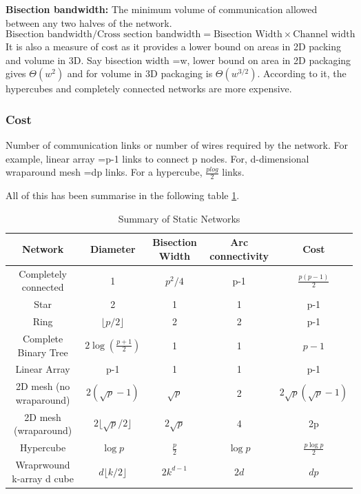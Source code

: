 \documentclass[12pt]{book}
\begin{document}
\textbf{Bisection bandwidth: }The minimum volume of communication allowed between any two halves of the network.
\begin{equation}
    \text{Bisection bandwidth/Cross section bandwidth} = \text{Bisection Width} \times \text{Channel width}
\end{equation}
It is also a measure of cost as it provides a lower bound on areas in 2D packing and volume in 3D.
Say bisection width =w, lower bound on area in 2D packaging gives $\Theta(w^2)$ and for volume in 3D packaging is $\Theta(w^{3/2})$.
According to it, the hypercubes and completely connected networks are more expensive.

\subsubsection{Cost}
Number of communication links or number of wires required by the network.
For example, linear array =p-1 links to connect p nodes. For, d-dimensional wraparound mesh =dp links.
For a hypercube, $\frac{plog}{2}$ links. 

All of this has been summarise in the following table \ref{tab:static_network}. 
\begin{table}[H]
    \centering
    \begin{tabular}{|c|c|c|c|c|}
        \hline
        Network & Diameter & Bisection Width & Arc connectivity & Cost  \\
        \hline
        Completely connected & 1 & $p^2/4$ & p-1 & $\frac{p(p-1)}{2}$ \\
        Star & 2 & 1 & 1 & p-1 \\
        Ring & $\lfloor p/2 \rfloor$ & 2 & 2 & p-1 \\
        Complete Binary Tree & $2\log(\frac{p+1}{2})$ & 1 & 1 & $p-1$ \\
        Linear Array & p-1 & 1 & 1 & p-1 \\
        2D mesh (no wraparound) & $2(\sqrt{p}-1)$ & $\sqrt{p}$ & 2 & $2\sqrt{p}(\sqrt{p}-1)$ \\
        2D mesh (wraparound) & $2\lfloor\sqrt{p}/2\rfloor$ & $2\sqrt{p}$ & 4 & 2p \\
        Hypercube & $\log p$ & $\frac{p}{2}$ & $\log p$ & $\frac{p \log p}{2}$ \\
        Wraprwound k-array d cube & $d \lfloor k/2\rfloor$ & $2k^{d-1}$ & $2d$ & $dp$ \\ 
        \hline
    \end{tabular}
    \caption{Summary of Static Networks}
    \label{tab:static_network}
\end{table}
\end{document}
